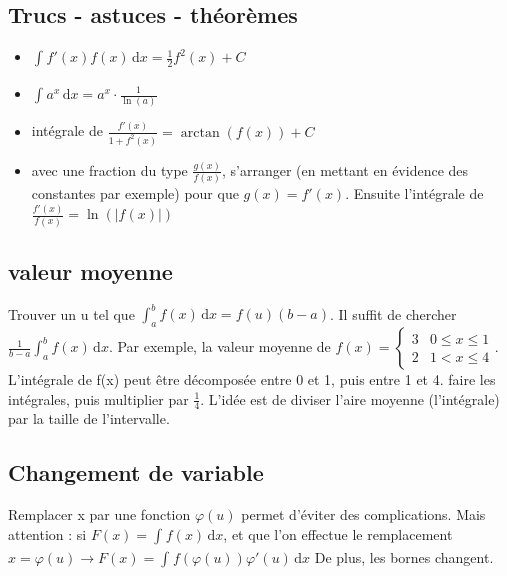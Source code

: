 \documentclass[12pt,a4paper]{article}
\newcommand{\intx}[3]{\ensuremath{\int_{#1}^{#2} #3 \, \mathrm dx}}
\begin{document}
\subsection{Trucs - astuces - théorèmes}
\begin{itemize}
	\item $\intx{}{}{f'(x)f(x)} = \frac{1}{2}f^2(x) + C$
	\item $\intx{}{}{a^x} = a^x\cdot \frac{1}{\ln(a)}$
	\item intégrale de $\frac{f'(x)}{1+f^2(x)} = \arctan(f(x)) +C$
	\item avec une fraction du type $\frac{g(x)}{f(x)}$, s'arranger (en mettant en évidence des constantes par exemple) pour que $g(x) = f'(x)$. Ensuite l'intégrale de $\frac{f'(x)}{f(x)} = \ln(|f(x)|)$
\end{itemize}
\subsection{valeur moyenne}
Trouver un u tel que $\intx{a}{b}{f(x)} = f(u)(b-a)$. Il suffit de chercher $\frac{1}{b-a}\intx{a}{b}{f(x)}$. Par exemple, la valeur moyenne de $f(x) = \left\{
\begin{array}{ll}
3 & 0 \leq x \leq 1\\
2 & 1 < x \leq 4
\end{array}\right.$. L'intégrale de f(x) peut être décomposée entre 0 et 1, puis entre  1 et 4. faire les intégrales, puis multiplier par $\frac{1}{4}$. L'idée est de diviser l'aire moyenne (l'intégrale) par la taille de l'intervalle.
\subsection{Changement de variable}
Remplacer x par une fonction $\varphi(u)$ permet d'éviter des complications. Mais attention : si $F(x) = \intx{}{}{f(x)}$, et que l'on effectue le remplacement $x = \varphi(u) \to F(x) = \intx{}{}{f(\varphi(u))\varphi'(u)}$ De plus, les bornes changent.
\end{document}
